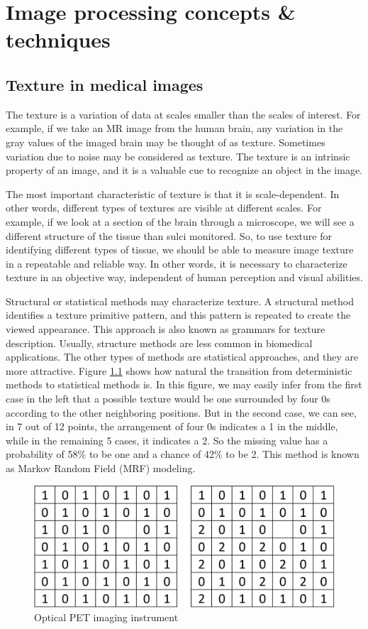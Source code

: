 \chapter{Image processing concepts \& techniques}
\label{sec:chap4}

\section{Texture in medical images}
The texture is a variation of data at scales smaller than the scales of interest. For example, if we take an MR image from the human brain, any variation in the gray values of the imaged brain may be thought of as texture. Sometimes variation due to noise may be considered as texture. The texture is an intrinsic property of an image, and it is a valuable cue to recognize an object in the image.

The most important characteristic of texture is that it is scale-dependent. In other words, different types of textures are visible at different scales. For example, if we look at a section of the brain through a microscope, we will see a different structure of the tissue than sulci monitored. So, to use texture for identifying different types of tissue, we should be able to measure image texture in a repeatable and reliable way. In other words, it is necessary to characterize texture in an objective way, independent of human perception and visual abilities.

Structural or statistical methods may characterize texture. A structural method identifies a texture primitive pattern, and this pattern is repeated to create the viewed appearance. This approach is also known as grammars for texture description. Usually, structure methods are less common in biomedical applications. The other types of methods are statistical approaches, and they are more attractive. Figure \ref{fig14} shows how natural the transition from deterministic methods to statistical methods is. In this figure, we may easily infer from the first case in the left that a possible texture would be one surrounded by four 0s according to the other neighboring positions. But in the second case, we can see, in 7 out of 12 points, the arrangement of four 0s indicates a 1 in the middle, while in the remaining 5 cases, it indicates a 2. So the missing value has a probability of 58\% to be one and a chance of 42\% to be 2. This method is known as Markov Random Field (MRF) modeling.

\begin{figure}[htbp]
	\centering \includegraphics[width=0.6\columnwidth]{./figures/Fig14.jpg}
	\caption{Optical PET imaging instrument}
	\label{fig14}
\end{figure}

